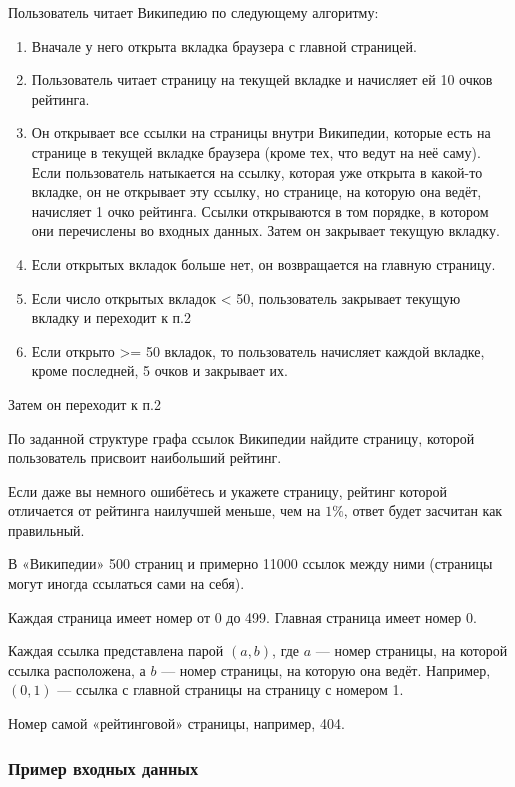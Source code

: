 
Пользователь читает Википедию по следующему алгоритму:

\begin{enumerate}
    \item Вначале у него открыта вкладка браузера с главной страницей.
    \item Пользователь читает страницу на текущей вкладке и начисляет ей 10 очков рейтинга.
    \item Он открывает все ссылки на страницы внутри Википедии, которые есть на странице в текущей вкладке браузера (кроме тех, что ведут на неё саму). Если пользователь натыкается на ссылку, которая уже открыта в какой-то вкладке, он не открывает эту ссылку, но странице, на которую она ведёт, начисляет 1 очко рейтинга. Ссылки открываются в том порядке, в котором они перечислены во входных данных. Затем он закрывает текущую вкладку.
    \item Если открытых вкладок больше нет, он возвращается на главную страницу.
    \item Если число открытых вкладок < 50, пользователь закрывает текущую вкладку и переходит к п.2
    \item Если открыто >= 50 вкладок, то пользователь начисляет каждой вкладке, кроме последней, 5 очков и закрывает их.
\end{enumerate}

Затем он переходит к п.2

По заданной структуре графа ссылок Википедии найдите страницу, которой пользователь присвоит 
наибольший рейтинг.

Если даже вы немного ошибётесь и укажете страницу, рейтинг которой отличается от рейтинга 
наилучшей меньше, чем на $1\%$, ответ будет засчитан как правильный.


В «Википедии» 500 страниц и примерно 11000 ссылок между ними (страницы могут иногда ссылаться сами на себя).

Каждая страница имеет номер от 0 до 499. Главная страница имеет номер 0.

Каждая ссылка представлена парой $(a,b)$, где $a$ — номер страницы, на которой ссылка расположена, 
а $b$ — номер страницы, на которую она ведёт. Например, $(0,1)$ — ссылка с главной страницы на страницу 
с номером 1.

\outputfmtSection

Номер самой «рейтинговой» страницы, например, 404.

\subsubsection*{Пример входных данных}

\noindent[(0, 200), (0, 399), (0, 499), (0, 303), (0, 104), (0, 90), (0, 60), (0, 410), 
(0, 272), (0, 9), (336, 109), (387, 139), (78, 77), (480, 225), (273, 189), (58, 395), 
$\cdots$ ]
